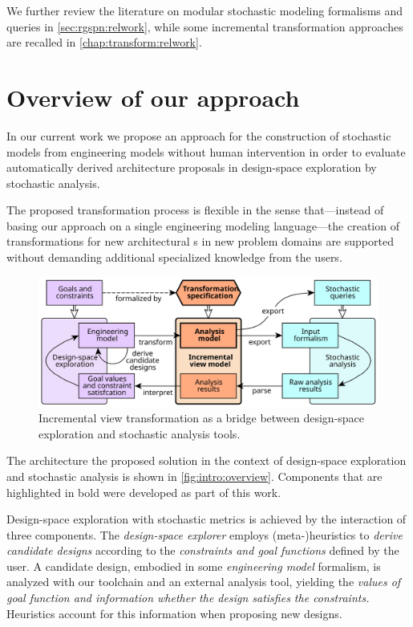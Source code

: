 We further review the literature on modular stochastic modeling formalisms and queries in \vref{sec:rgspn:relwork}, while some incremental transformation approaches are recalled in \vref{chap:transform:relwork}.

\section{Overview of our approach}
\label{sec:intro:approach}

In our current work we propose an approach for the construction of stochastic models from engineering models without human intervention in order to evaluate automatically derived architecture proposals in design-space exploration by stochastic analysis.

The proposed transformation process is flexible in the sense that---instead of basing our approach on a single engineering modeling language---the creation of transformations for new architectural s in new problem domains are supported without demanding additional specialized knowledge from the users.

\begin{figure}
  \centering
  \includegraphics[scale=0.9]{figures/overview}
  \caption{Incremental view transformation as a bridge between design-space exploration and stochastic analysis tools.}
  \label{fig:intro:overview}
\end{figure}

The architecture the proposed solution in the context of design-space exploration and stochastic analysis is shown in \vref{fig:intro:overview}. Components that are highlighted in bold were developed as part of this work.

Design-space exploration with stochastic metrics is achieved by the interaction of three components. The \emph{design-space explorer} employs (meta-)heuristics to \emph{derive candidate designs} according to the \emph{constraints and goal functions} defined by the user. A candidate design, embodied in some \emph{engineering model} formalism, is analyzed with our toolchain and an external analysis tool, yielding the \emph{values of goal function and information whether the design satisfies the constraints.} Heuristics account for this information when proposing new designs.

